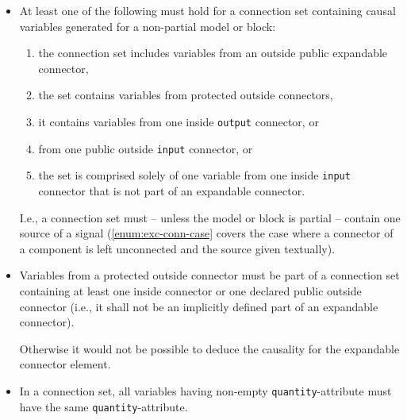 \begin{itemize}
  A connection set of causal variables (\lstinline!input!/\lstinline!output!) may at most contain variables from one inside \lstinline!output! connector (for state-machines extended as specified in \cref{merging-connections-to-multiple-outputs}) or one public outside \lstinline!input! connector.
  \begin{nonnormative}
  I.e., a connection set may at most contain one source of a signal.
  \end{nonnormative}
\item
  At least one of the following must hold for a connection set containing causal variables generated for a non-partial model or block:
\begin{enumerate}
\item
  the connection set includes variables from an outside public expandable connector,
\item
  the set contains variables from protected outside connectors,
\item
  it contains variables from one inside \lstinline!output! connector, or
\item
  from one public outside \lstinline!input! connector, or
\item\label{enum:exc-conn-case}%
  the  set is comprised solely of one variable from one inside \lstinline!input! connector that is not part of an expandable connector.
\end{enumerate}
\begin{nonnormative}
I.e., a connection set must -- unless the model or block is partial -- contain one source of a signal (\cref{enum:exc-conn-case} covers the case where a connector of a component is left unconnected and the source given textually).
\end{nonnormative}
\item
  Variables from a protected outside connector must be part of a connection set containing at least one inside connector or one declared public outside connector (i.e., it shall not be an implicitly defined part of an expandable connector).
  \begin{nonnormative}
  Otherwise it would not be possible to deduce the causality for the expandable connector element.
  \end{nonnormative}
\item\label{connect-set-quantity-rule}
  In a connection set, all variables having non-empty \lstinline!quantity!-attribute must have the same \lstinline!quantity!-attribute.
  \begin{nonnormative}

\end{nonnormative}
\end{itemize}
